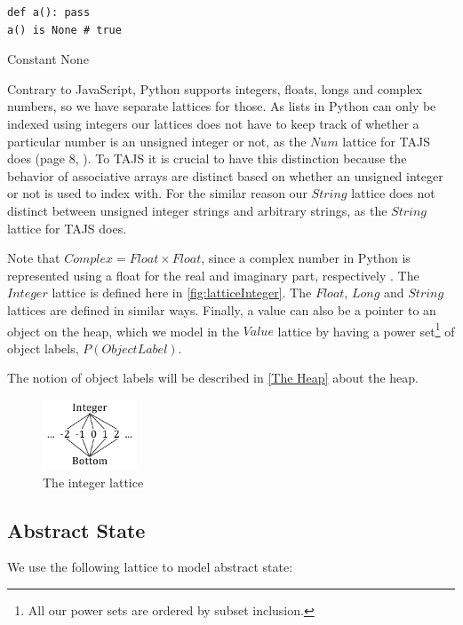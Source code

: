 \begin{listing}[H]
	\begin{verbatim}
def a(): pass
a() is None # true
	\end{verbatim}
	\caption{Constant None}\label{code:NoneExample}
\end{listing}

Contrary to JavaScript, Python supports integers, floats, longs and complex numbers, so we have separate lattices for those. As lists in Python can only be indexed using integers our lattices does not have to keep track of whether a particular number is an unsigned integer or not, as the $Num$ lattice for TAJS does (page 8, \cite{tajs}). To TAJS it is crucial to have this distinction because the behavior of associative arrays are distinct based on whether an unsigned integer or not is used to index with. For the similar reason our $String$ lattice does not distinct between unsigned integer strings and arbitrary strings, as the $String$ lattice for TAJS does.

Note that $Complex = Float \times Float$, since a complex number in Python is represented using a float for the real and imaginary part, respectively \cite{pyref.stdtypes}. The $Integer$ lattice is defined here in \autoref{fig:latticeInteger}. The $Float$, $Long$ and $String$ lattices are defined in similar ways. Finally, a value can also be a pointer to an object on the heap, which we model in the $Value$ lattice by having a power set\footnote{All our power sets are ordered by subset inclusion.} of object labels, $P(ObjectLabel)$.

The notion of object labels will be described in \autoref{The Heap} about the heap.

\begin{figure}[H]
	\begin{center}
		\includegraphics[width=0.25\textwidth]{images/integer-lattice.png}
	\end{center}
	\vspace{-15pt}
	\caption{The integer lattice}
	\label{fig:latticeInteger}
\end{figure}



\subsection{Abstract State}
We use the following lattice to model abstract state:


